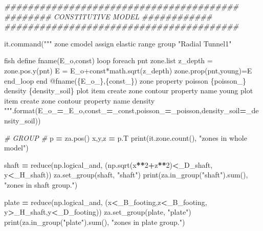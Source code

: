 \documentclass[a4paper, nobind]{templates/ociamthesis}
\newenvironment{Shaded}{\begin{snugshade}}{\end{snugshade}}
\newcommand{\BuiltInTok}[1]{#1}
\newcommand{\CommentTok}[1]{\textcolor[rgb]{0.56,0.35,0.01}{\textit{#1}}}
\newcommand{\DecValTok}[1]{\textcolor[rgb]{0.00,0.00,0.81}{#1}}
\newcommand{\NormalTok}[1]{#1}
\newcommand{\OperatorTok}[1]{\textcolor[rgb]{0.81,0.36,0.00}{\textbf{#1}}}
\newcommand{\SpecialCharTok}[1]{\textcolor[rgb]{0.00,0.00,0.00}{#1}}
\newcommand{\StringTok}[1]{\textcolor[rgb]{0.31,0.60,0.02}{#1}}
\renewenvironment{Shaded}
{
  \vspace{10pt}%
  \begin{snugshade}%
}{%
  \end{snugshade}%
  \vspace{8pt}%
}
\begin{document}
\begin{Shaded}
\begin{Highlighting}[]
\CommentTok{\#\#\#\#\#\#\#\#\#\#\#\#\#\#\#\#\#\#\#\#\#\#\#\#\#\#\#\#\#\#\#\#\#\#\#\#\#\#\#\#}
\CommentTok{\#\#\#\#\#\#\#\# CONSTITUTIVE MODEL \#\#\#\#\#\#\#\#\#\#\#\#}
\CommentTok{\#\#\#\#\#\#\#\#\#\#\#\#\#\#\#\#\#\#\#\#\#\#\#\#\#\#\#\#\#\#\#\#\#\#\#\#\#\#\#\#}

\NormalTok{it.command(}\StringTok{"""}
\StringTok{zone cmodel assign elastic range group "Radial Tunnel1"}

\StringTok{fish define fname(E\_o,const)}
\StringTok{loop foreach pnt zone.list}
\StringTok{z\_depth = zone.pos.y(pnt)}
\StringTok{E = E\_o+const*math.sqrt(z\_depth)}
\StringTok{zone.prop(pnt,\textquotesingle{}young\textquotesingle{})=E}
\StringTok{end\_loop}
\StringTok{end}
\StringTok{@fname(}\SpecialCharTok{\{E\_o\_\}}\StringTok{,}\SpecialCharTok{\{const\_\}}\StringTok{)}
\StringTok{zone property poisson }\SpecialCharTok{\{poisson\_\}}\StringTok{ density }\SpecialCharTok{\{density\_soil\}}
\StringTok{plot item create zone contour property name \textquotesingle{}young\textquotesingle{}}
\StringTok{plot item create zone contour property name \textquotesingle{}density\textquotesingle{}}
\StringTok{"""}\NormalTok{.}\BuiltInTok{format}\NormalTok{(E\_o\_}\OperatorTok{=}\NormalTok{\_E\_o,const\_}\OperatorTok{=}\NormalTok{\_const,poisson\_}\OperatorTok{=}\NormalTok{\_poisson,density\_soil}\OperatorTok{=}\NormalTok{\_density\_soil))}

\CommentTok{\# GROUP \#}
\NormalTok{p }\OperatorTok{=}\NormalTok{ za.pos()}
\NormalTok{x,y,z }\OperatorTok{=}\NormalTok{ p.T}
\BuiltInTok{print}\NormalTok{(it.zone.count(), }\StringTok{"zones in whole model"}\NormalTok{)}

\NormalTok{shaft }\OperatorTok{=} \BuiltInTok{reduce}\NormalTok{(np.logical\_and, (np.sqrt(x}\OperatorTok{**}\DecValTok{2}\OperatorTok{+}\NormalTok{z}\OperatorTok{**}\DecValTok{2}\NormalTok{)}\OperatorTok{\textless{}}\NormalTok{\_D\_shaft, y}\OperatorTok{\textless{}}\NormalTok{\_H\_shaft))}
\NormalTok{za.set\_group(shaft, }\StringTok{"shaft"}\NormalTok{) }
\BuiltInTok{print}\NormalTok{(za.in\_group(}\StringTok{"shaft"}\NormalTok{).}\BuiltInTok{sum}\NormalTok{(), }\StringTok{"zones in shaft group."}\NormalTok{) }

\NormalTok{plate }\OperatorTok{=} \BuiltInTok{reduce}\NormalTok{(np.logical\_and, (x}\OperatorTok{\textless{}}\NormalTok{\_B\_footing,z}\OperatorTok{\textless{}}\NormalTok{\_B\_footing, y}\OperatorTok{\textgreater{}}\NormalTok{\_H\_shaft,y}\OperatorTok{\textless{}}\NormalTok{\_D\_footing))}
\NormalTok{za.set\_group(plate, }\StringTok{"plate"}\NormalTok{)}
\BuiltInTok{print}\NormalTok{(za.in\_group(}\StringTok{"plate"}\NormalTok{).}\BuiltInTok{sum}\NormalTok{(), }\StringTok{"zones in plate group."}\NormalTok{)}


\end{Highlighting}
\end{Shaded}
\end{document}
